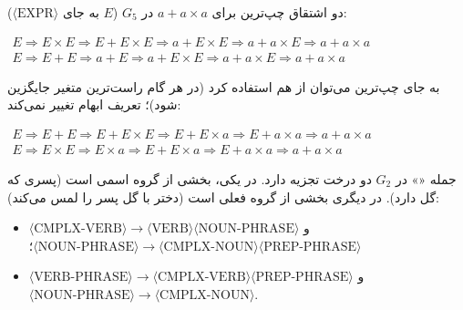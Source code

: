 \begin{example}
دو اشتقاق چپ‌ترین برای $a+a\times a$ در $G_5$ ($E$ به جای $\langle\text{EXPR}\rangle$):
\begin{ltrfig}
$\begin{array}{l}
E\Rightarrow E\times E\Rightarrow E+E\times E\Rightarrow a+E\times E\Rightarrow a+a\times E\Rightarrow a+a\times a\\[3pt]
E\Rightarrow E+E\Rightarrow a+E\Rightarrow a+E\times E\Rightarrow a+a\times E\Rightarrow a+a\times a
\end{array}$
\end{ltrfig}
به جای چپ‌ترین می‌توان از  هم استفاده کرد (در هر گام راست‌ترین متغیر جایگزین شود)؛ تعریف ابهام تغییر نمی‌کند:
\begin{ltrfig}
$\begin{array}{l}
E\Rightarrow E+E\Rightarrow E+E\times E\Rightarrow E+E\times a\Rightarrow E+a\times a\Rightarrow a+a\times a\\[3pt]
E\Rightarrow E\times E\Rightarrow E\times a\Rightarrow E+E\times a\Rightarrow E+a\times a\Rightarrow a+a\times a
\end{array}$
\end{ltrfig}
\end{example}

\begin{example}
جمله «» در $G_2$ دو درخت تجزیه دارد. در یکی،  بخشی از گروه اسمی  است (پسری که گل دارد). در دیگری بخشی از گروه فعلی است (دختر با گل پسر را لمس می‌کند):
\begin{itemize}
\item $\langle\text{CMPLX-VERB}\rangle\to\langle\text{VERB}\rangle\langle\text{NOUN-PHRASE}\rangle$ و $\langle\text{NOUN-PHRASE}\rangle\to\langle\text{CMPLX-NOUN}\rangle\langle\text{PREP-PHRASE}\rangle$؛
\item $\langle\text{VERB-PHRASE}\rangle\to\langle\text{CMPLX-VERB}\rangle\langle\text{PREP-PHRASE}\rangle$ و $\langle\text{NOUN-PHRASE}\rangle\to\langle\text{CMPLX-NOUN}\rangle$.
\end{itemize}
\end{example}

